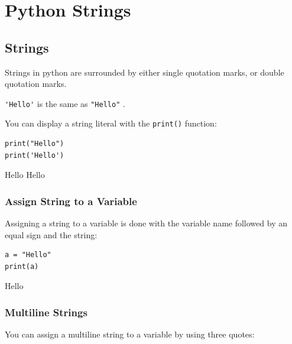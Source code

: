 \documentclass[12pt,a4paper]{article}
\newcommand{\code}[1]{%
	\colorbox{backcolour}{\lstinline{#1}}%
}
\begin{document}
\section{Python Strings}
\subsection{Strings}
Strings in python are surrounded by either single quotation marks, or double
quotation marks.

\code{'Hello'} is the same as \code{"Hello"}.

You can display a string literal with the \code{print()} function:

\begin{ebox}
	\begin{lstlisting}
print("Hello")
print('Hello')
	\end{lstlisting}
\tcblower
	\begin{vercode}
Hello
Hello
	\end{vercode}
\end{ebox}

\subsubsection{Assign String to a Variable}

Assigning a string to a variable is done with the variable name followed by an
equal sign and the string:

\begin{ebox}
	\begin{lstlisting}
a = "Hello"
print(a)
	\end{lstlisting}
\tcblower
	\begin{vercode}
Hello
	\end{vercode}
\end{ebox}
\subsubsection{Multiline Strings}

You can assign a multiline string to a variable by using three quotes:
\end{document}
